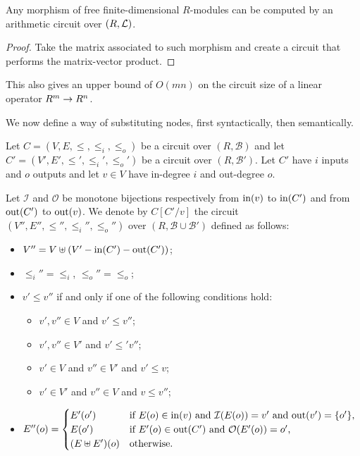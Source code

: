 \begin{proposition}
  Any morphism of free finite-dimensional $R$-modules can be computed
  by an arithmetic circuit over $(R,\mathcal{L})$.
\end{proposition}
\begin{proof}
  Take the matrix associated to such morphism and create a circuit
  that performs the matrix-vector product.
\end{proof}

This also gives an upper bound of $O(mn)$ on the circuit size of a
linear operator $R^m\rightarrow R^n$.

We now define a way of substituting nodes, first syntactically, then
semantically.

\begin{definition}
  \label{def:syntax-subst}
  Let $C=(V,E,\le,\le_i,\le_o)$ be a circuit over $(R,\mathcal{B})$
  and let $C'=(V',E',\le',\le_i',\le_o')$ be a circuit over
  $(R,\mathcal{B}')$. Let $C'$ have $i$ inputs and $o$ outputs and let
  $v\in V$ have in-degree $i$ and out-degree $o$.

  Let $\mathcal{I}$ and $\mathcal{O}$ be monotone bijections
  respectively from $\operatorname{in}(v)$ to $\operatorname{in}(C')$ and from $\operatorname{out}(C')$ to
  $\operatorname{out}(v)$. We denote by $C[C'/v]$ the circuit
  $(V'',E'',\le'',\le_i'',\le_o'')$ over
  $(R,\mathcal{B}\cup\mathcal{B}')$ defined as follows:
  \begin{itemize}
  \item $V'' = V\uplus (V' - \operatorname{in}(C') - \operatorname{out}(C'))$;
  \item $\le_i''=\le_i$, $\le_o''=\le_o$;
  \item $v'\le v''$ if and only if one of the following conditions hold:
    \begin{itemize}
    \item $v',v''\in V$ and $v'\le v''$;
    \item $v',v''\in V'$ and $v'\le' v''$;
    \item $v'\in V$ and $v''\in V'$ and $v'\le v$;
    \item $v'\in V'$ and $v''\in V$ and $v\le v''$;
    \end{itemize}
  \item $E''(o) = \begin{cases}
      E'(o') & \text{if $E(o)\in\operatorname{in}(v)$ and $\mathcal{I}(E(o))=v'$ and $\operatorname{out}(v')=\{o'\}$,}\\
      E(o') & \text{if $E'(o)\in\operatorname{out}(C')$ and $\mathcal{O}(E'(o))=o'$,}\\
      (E\uplus E')(o) & \text{otherwise.}
    \end{cases}$
  \end{itemize}
\end{definition}

